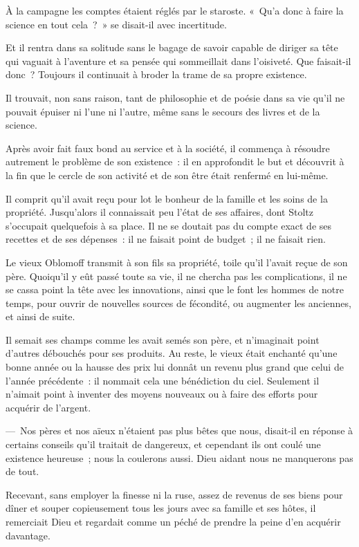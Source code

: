 \documentclass[french,twoside]{book} %
\begin{document}
À la campagne les comptes étaient réglés par le staroste. « Qu’a donc à faire la science en tout cela ? » se disait-il avec incertitude.\par
Et il rentra dans sa solitude sans le bagage de savoir capable de diriger sa tête qui vaguait à l’aventure et sa pensée qui sommeillait dans l’oisiveté. Que faisait-il donc ? Toujours il continuait à broder la trame de sa propre existence.\par
Il trouvait, non sans raison, tant de philosophie et de poésie dans sa vie qu’il ne pouvait épuiser ni l’une ni l’autre, même sans le secours des livres et de la science.\par
Après avoir fait faux bond au service et à la société, il commença à résoudre autrement le problème de son existence : il en approfondit le but et découvrit à la fin que le cercle de son activité et de son être était renfermé en lui-même.\par
Il comprit qu’il avait reçu pour lot le bonheur de la famille et les soins de la propriété. Jusqu’alors il connaissait peu l’état de ses affaires, dont Stoltz s’occupait quelquefois à sa place. Il ne se doutait pas du compte exact de ses recettes et de ses dépenses : il ne faisait point de budget ; il ne faisait rien.\par
Le vieux Oblomoff transmit à son fils sa propriété, toile qu’il l’avait reçue de son père. Quoiqu’il y eût passé toute sa vie, il ne chercha pas les complications, il ne se cassa point la tête avec les innovations, ainsi que le font les hommes de notre temps, pour ouvrir de nouvelles sources de fécondité, ou augmenter les anciennes, et ainsi de suite.\par
Il semait ses champs comme les avait semés son père, et n’imaginait point d’autres débouchés pour ses produits. Au reste, le vieux était enchanté qu’une bonne année ou la hausse des prix lui donnât un revenu plus grand que celui de l’année précédente : il nommait cela une bénédiction du ciel. Seulement il n’aimait point à inventer des moyens nouveaux ou à faire des efforts pour acquérir de l’argent.\par
— Nos pères et nos aïeux n’étaient pas plus bêtes que nous, disait-il en réponse à certains conseils qu’il traitait de dangereux, et cependant ils ont coulé une existence heureuse ; nous la coulerons aussi. Dieu aidant nous ne manquerons pas de tout.\par
Recevant, sans employer la finesse ni la ruse, assez de revenus de ses biens pour dîner et souper copieusement tous les jours avec sa famille et ses hôtes, il remerciait Dieu et regardait comme un péché de prendre la peine d’en acquérir davantage.\par
\end{document}
